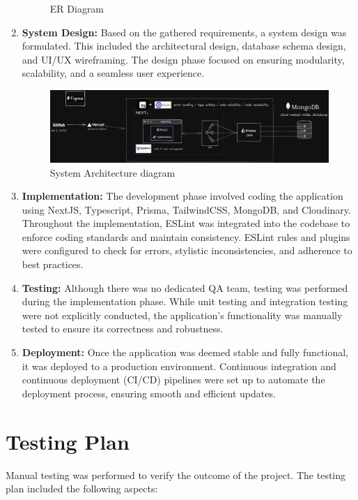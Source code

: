 \begin{enumerate}
\begin{figure}[!h]
		\caption{ER Diagram}
	\end{figure}
	\item \textbf{System Design:} Based on the gathered requirements, a system design was formulated. This included the architectural design, database schema design, and UI/UX wireframing. The design phase focused on ensuring modularity, scalability, and a seamless user experience.
	\begin{figure}[!h]
		\centering
		\includegraphics[scale=0.05]{chapters/images/airbnb-clone.png}
		\caption{System Architecture diagram}
	\end{figure}
	\item \textbf{Implementation:} The development phase involved coding the application using NextJS, Typescript, Prisma, TailwindCSS, MongoDB, and Cloudinary. Throughout the implementation, ESLint was integrated into the codebase to enforce coding standards and maintain consistency. ESLint rules and plugins were configured to check for errors, stylistic inconsistencies, and adherence to best practices.
	\item \textbf{Testing:} Although there was no dedicated QA team, testing was performed during the implementation phase. While unit testing and integration testing were not explicitly conducted, the application's functionality was manually tested to ensure its correctness and robustness.
	\item \textbf{Deployment:} Once the application was deemed stable and fully functional, it was deployed to a production environment. Continuous integration and continuous deployment (CI/CD) pipelines were set up to automate the deployment process, ensuring smooth and efficient updates.
\end{enumerate}

\section{Testing Plan}
Manual testing was performed to verify the outcome of the project. The testing plan included the following aspects:


